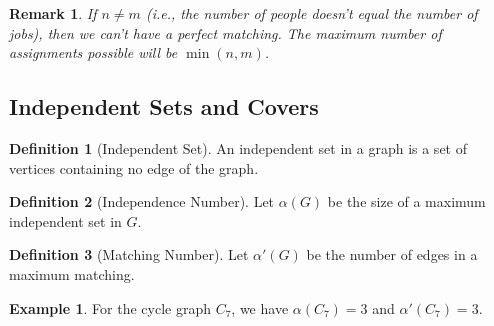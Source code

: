 \documentclass{article}
\newtheorem{remark}{Remark}
\theoremstyle{definition}
\newtheorem{example}{Example}
\newtheorem{definition}{Definition}
\begin{document}
\begin{remark}
If $n \neq m$ (i.e., the number of people doesn't equal the number of jobs), then we can't have a perfect matching. The maximum number of assignments possible will be $\min(n, m)$.
\end{remark}

\subsection{Independent Sets and Covers}

\begin{definition}[Independent Set]
An independent set in a graph is a set of vertices containing no edge of the graph.
\end{definition}

\begin{definition}[Independence Number]
Let $\alpha(G)$ be the size of a maximum independent set in $G$.
\end{definition}

\begin{figure}[h]
\centering
{}
\end{figure}

\begin{definition}[Matching Number]
Let $\alpha'(G)$ be the number of edges in a maximum matching.
\end{definition}

\begin{example}
For the cycle graph $C_7$, we have $\alpha(C_7) = 3$ and $\alpha'(C_7) = 3$.
\end{example}
\end{document}
